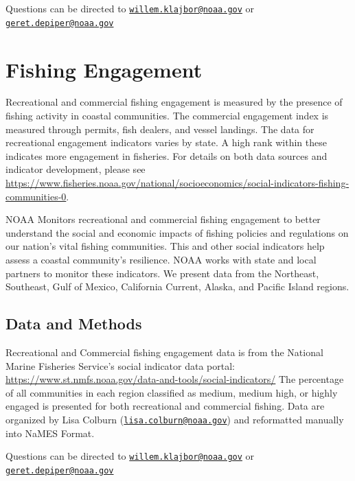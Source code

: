 \documentclass[
]{book}
\begin{document}
Questions can be directed to \href{mailto:willem.klajbor@noaa.gov}{\nolinkurl{willem.klajbor@noaa.gov}} or \href{mailto:geret.depiper@noaa.gov}{\nolinkurl{geret.depiper@noaa.gov}}

\hypertarget{fishing-engagement}{%
\chapter{Fishing Engagement}\label{fishing-engagement}}

Recreational and commercial fishing engagement is measured by the presence of fishing activity in coastal communities. The commercial engagement index is measured through permits, fish dealers, and vessel landings. The data for recreational engagement indicators varies by state. A high rank within these indicates more engagement in fisheries. For details on both data sources and indicator development, please see \url{https://www.fisheries.noaa.gov/national/socioeconomics/social-indicators-fishing-communities-0}.

NOAA Monitors recreational and commercial fishing engagement to better understand the social and economic impacts of fishing policies and regulations on our nation's vital fishing communities. This and other social indicators help assess a coastal community's resilience. NOAA works with state and local partners to monitor these indicators. We present data from the Northeast, Southeast, Gulf of Mexico, California Current, Alaska, and Pacific Island regions.

\hypertarget{data-and-methods-1}{%
\section{Data and Methods}\label{data-and-methods-1}}

Recreational and Commercial fishing engagement data is from the National Marine Fisheries Service's social indicator data portal: \url{https://www.st.nmfs.noaa.gov/data-and-tools/social-indicators/} The percentage of all communities in each region classified as medium, medium high, or highly engaged is presented for both recreational and commercial fishing. Data are organized by Lisa Colburn (\href{mailto:lisa.colburn@noaa.gov}{\nolinkurl{lisa.colburn@noaa.gov}}) and reformatted manually into NaMES Format.

Questions can be directed to \href{mailto:willem.klajbor@noaa.gov}{\nolinkurl{willem.klajbor@noaa.gov}} or \href{mailto:geret.depiper@noaa.gov}{\nolinkurl{geret.depiper@noaa.gov}}
\end{document}
